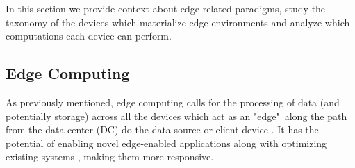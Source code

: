 
In this section we provide context about edge-related paradigms, study the taxonomy of the devices which materialize edge environments and analyze which computations each device can perform.

\subsection{Edge Computing}

As previously mentioned, edge computing calls for the processing of data (and potentially storage) across all the devices which act as an "edge"\ along the path from the data center (DC) do the data source or client device \cite{Leitao2018}. It has the potential of enabling novel edge-enabled applications along with optimizing existing systems \cite{7488250}, making them more responsive.

%
%    
%
%    
%    


